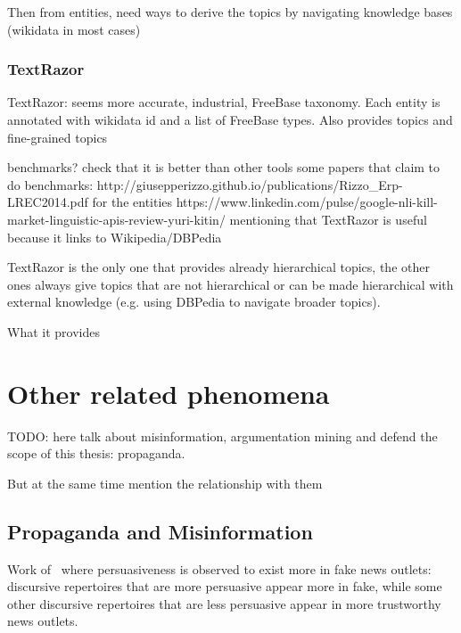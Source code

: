 Then from entities, need ways to derive the topics by navigating knowledge bases (wikidata in most cases)

\subsubsection{TextRazor}
TextRazor: seems more accurate, industrial, FreeBase taxonomy. Each entity is annotated with wikidata id and a list of FreeBase types. Also provides topics and fine-grained topics

benchmarks? check that it is better than other tools
some papers that claim to do benchmarks:
http://giusepperizzo.github.io/publications/Rizzo\_Erp-LREC2014.pdf for the entities
https://www.linkedin.com/pulse/google-nli-kill-market-linguistic-apis-review-yuri-kitin/ mentioning that TextRazor is useful because it links to Wikipedia/DBPedia

TextRazor is the only one that provides already hierarchical topics, the other ones always give topics that are not hierarchical or can be made hierarchical with external knowledge (e.g. using DBPedia to navigate broader topics).

What it provides


\section{\statusred Other related phenomena}
\label{sec:lit_related}

TODO: here talk about misinformation, argumentation mining and defend the scope of this thesis: propaganda.

But at the same time mention the relationship with them

\subsection{Propaganda and Misinformation}
\label{sec:lit_related_misinformation}

Work of~\citet{orrumachine} where persuasiveness is observed to exist more in fake news outlets: discursive repertoires that are more persuasive appear more in fake, while some other discursive repertoires that are less persuasive appear in more trustworthy news outlets.




